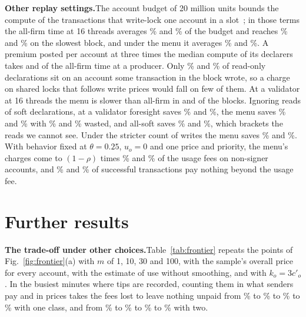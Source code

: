 \documentclass[conference,compsoc]{IEEEtran}
\numberwithin{equation}{section}
\theoremstyle{plain}
\theoremstyle{definition}
\theoremstyle{remark}
\newcommand{\runin}[1]{\par\smallskip\noindent\textbf{#1.}\enspace}
\newcommand{\cp}{c'}
\begin{document}
\runin{Other replay settings}The account budget of 20 million units bounds the compute of the transactions that write-lock one account in a slot~\cite{agave}; in those terms the all-firm time at 16 threads averages \firmMeanBudgetSixteenA\% and \firmMeanBudgetSixteenB\% of the budget and reaches \firmMaxBudgetSixteenA\% and \firmMaxBudgetSixteenB\% on the slowest block, and under the menu it averages \menuLoMeanBudgetSixteenA\% and \menuLoMeanBudgetSixteenB\%. A premium posted per account at three times the median compute of its declarers takes \freePostedRatioSixteenA{} and \freePostedRatioSixteenB{} of the all-firm time at a producer. Only \roWrittenA\% and \roWrittenB\% of read-only declarations sit on an account some transaction in the block wrote, so a charge on shared locks that follows write prices would fall on few of them. At a validator at 16 threads the menu is slower than all-firm in \menuLoSlowerSixteenA{} and \menuLoSlowerSixteenB{} of the \nBlocksHalf{} blocks. Ignoring reads of soft declarations, at a validator foresight saves \writesOracleCutSixteenA\% and \writesOracleCutSixteenB\%, the menu saves \writesMenuLoCutSixteenA\% and \writesMenuLoCutSixteenB\% with \writesMenuLoWasteSixteenA\% and \writesMenuLoWasteSixteenB\% wasted, and all-soft saves \writesSoftCutSixteenA\% and \writesSoftCutSixteenB\%, which brackets the reads we cannot see. Under the stricter count of writes the menu saves \strictMenuLoCutSixteenA\% and \strictMenuLoCutSixteenB\%. With behavior fixed at $\theta = 0.25$, $u_o = 0$ and one price and priority, the menu's charges come to $(1-\rho)$ times \incOverUsageA\% and \incOverUsageB\% of the usage fees on non-signer accounts, and \incOkFreeA\% and \incOkFreeB\% of successful transactions pay nothing beyond the usage fee.



\section{Further results}\label{app:more}







\runin{The trade-off under other choices}Table~\ref{tab:frontier} repeats the points of Fig.~\ref{fig:frontier}(a) with $m$ of 1, 10, 30 and 100, with the sample's overall price for every account, with the estimate of use without smoothing, and with $k_o = 3\cp_o$. In the busiest minutes where tips are recorded, counting them in what senders pay and in prices takes the fees lost to leave nothing unpaid from \winFrOneSameMin\% to \winFrOneSameMax\% to \winFrOneTipsMin\% to \winFrOneTipsMax\% with one class, and from \winFrTwoSameMin\% to \winFrTwoSameMax\% to \winFrTwoTipsMin\% to \winFrTwoTipsMax\% with two.
\end{document}

